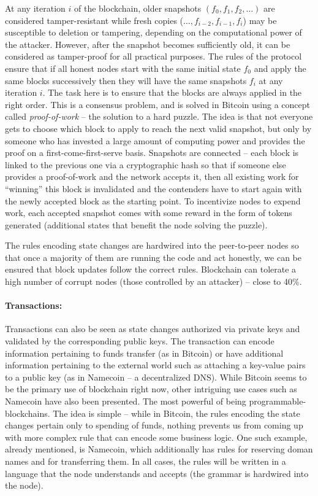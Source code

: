\documentclass[]{report}   %
\begin{document}
{At any iteration $i$ of the blockchain, older snapshots $(f_0, f_1, f_2, \ldots)$ are considered tamper-resistant while fresh copies ($\ldots, f_{i-2}, f_{i-1}, f_i$) may be susceptible to deletion or tampering, depending on the computational power of the attacker. However, after the snapshot becomes sufficiently old, it can be considered as tamper-proof for all practical purposes. The rules of the protocol ensure that if all honest nodes start with the same initial state $f_0$ and apply the same blocks successively then they will have the same snapshots $f_i$ at any iteration $i$. The task here is to ensure that the blocks are always applied in the right order. This is a consensus problem, and is solved in Bitcoin using a concept called {\em proof-of-work} -- the solution to a hard puzzle. The idea is that not everyone gets to choose which block to apply to reach the next valid snapshot, but only by someone who has invested a large amount of computing power and provides the proof on a first-come-first-serve basis. Snapshots are connected -- each block is linked to the previous one via a cryptographic hash so that if someone else provides a proof-of-work and the network accepts it, then all existing work for ``winning'' this block is invalidated and the contenders have to start again with the newly accepted block as the starting point. To incentivize nodes to expend work, each accepted snapshot comes with some reward in the form of tokens generated (additional states that benefit the node solving the puzzle). 

The rules encoding state changes are hardwired into the peer-to-peer nodes so that once a majority of them are running the code and act honestly, we can be ensured that block updates follow the correct rules. Blockchain can tolerate a high number of corrupt nodes (those controlled by an attacker) -- close to 40\%. 

\paragraph{Transactions:} Transactions can also be seen as state changes authorized via private keys and validated by the corresponding public keys. The transaction can encode information pertaining to funds transfer (as in Bitcoin) or have additional information pertaining to the external world such as attaching a key-value pairs to a public key (as in Namecoin -- a decentralized DNS).
While Bitcoin seems to be the primary use of blockchain right now, other intriguing use cases such as Namecoin have also been presented. The most powerful of being programmable-blockchains. The idea is simple -- while in Bitcoin, the rules encoding the state changes pertain only to spending of funds, nothing prevents us from coming up with more complex rule that can encode some business logic. One such example, already mentioned, is Namecoin, which additionally has rules for reserving doman names and for transferring them. In all cases, the rules will be written in a language that the node understands and accepts (the grammar is hardwired into the node). 

}
\end{document}
